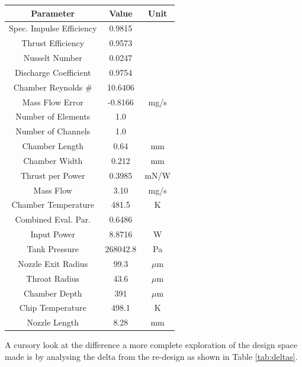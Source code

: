 \documentclass{homework}
\begin{document}
\begin{multicols}{2}
\begin{minipage}{\linewidth} %
\centering
{}
\label{tab:best_design}
\begin{tabular}{|c|c|c|}
\hline
\textbf{Parameter} & \textbf{Value} & \textbf{Unit} \\
\hline
Spec. Impulse Efficiency & 0.9815 & \\
Thrust Efficiency & 0.9573 & \\
Nusselt Number & 0.0247 & \\
Discharge Coefficient & 0.9754 & \\
Chamber Reynolds \# & 10.6406 & \\
Mass Flow Error & -0.8166 & mg/s \\
Number of Elements & 1.0 & \\
Number of Channels & 1.0 & \\
Chamber Length & 0.64 & mm \\
Chamber Width & 0.212 & mm \\
Thrust per Power & 0.3985 & mN/W \\
Mass Flow & 3.10 & mg/s \\
Chamber Temperature & 481.5 & K \\
Combined Eval. Par. & 0.6486 & \\
Input Power & 8.8716 & W \\
Tank Pressure & 268042.8 & Pa \\
Nozzle Exit Radius & 99.3 & $\mu$m \\
Throat Radius & 43.6 & $\mu$m \\
Chamber Depth & 391 & $\mu$m \\
Chip Temperature & 498.1 & K \\
Nozzle Length & 8.28 & mm \\
\hline
\end{tabular}
\end{minipage}

A cursory look at the difference a more complete exploration of the design space made is by analysing the delta from the re-design as shown in Table \ref{tab:deltas}.



\end{multicols}
\end{document}
